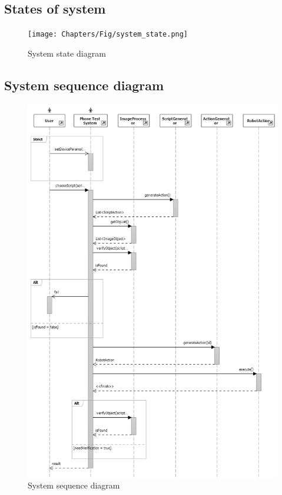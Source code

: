 \subsection{States of system}
    \begin{figure}[H]
		\centering
		\texttt{[image: Chapters/Fig/system\_state.png]}
		\caption{System state diagram}
		\label{fig:system_state}
	\end{figure}


\subsection{System sequence diagram}
    \begin{figure}[H]
		\centering
		\includegraphics[scale=0.75]{Chapters/Fig/sequence_diagram.png}
		\caption{System sequence diagram}
		\label{fig:sequence_diagram}
	\end{figure}

